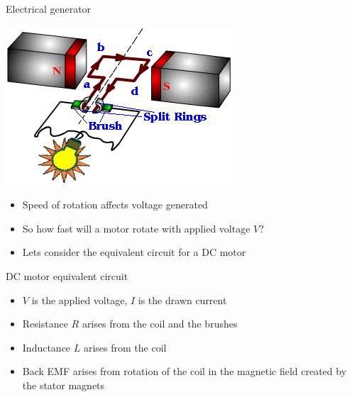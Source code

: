 \documentclass[compress]{beamer}
\begin{document}
\begin{frame}{Electrical generator}

    \begin{center}
        \includegraphics[width=0.6\linewidth]{image30}
    \end{center}

\begin{itemize}

\item Speed of rotation affects voltage generated
\item So how fast will a motor rotate with applied voltage $V$?
\item Lets consider the equivalent circuit for a DC motor
\end{itemize}
\end{frame}

\begin{frame}{DC motor equivalent circuit}

    \begin{center}
    \end{center}

\footnotesize
\begin{itemize}

\item $V$ is the applied voltage, $I$ is the drawn current
\item Resistance $R$ arises from the coil and the brushes
\item Inductance $L$ arises from the coil
\item Back EMF arises from rotation of the coil in the magnetic field
  created by the stator magnets
\end{itemize}

\end{frame}
\end{document}
